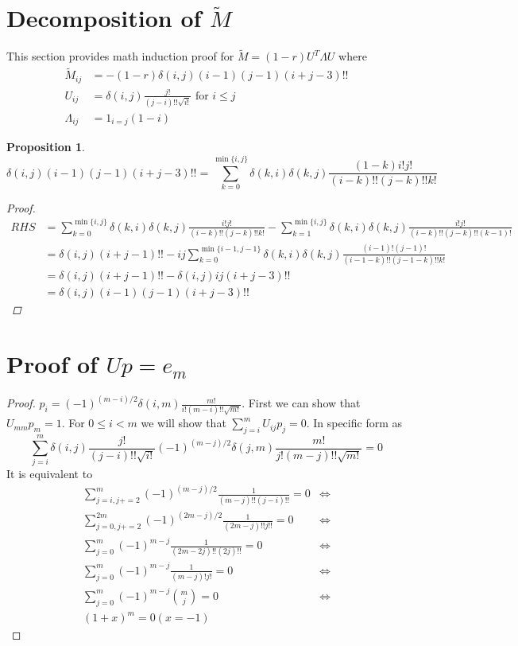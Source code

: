 \documentclass{article}
\newtheorem{proposition}{Proposition}
\begin{document}
\section{Decomposition of $\widetilde{M}$}
This section provides math induction proof for
$\widetilde{M}= (1-r) U^T \Lambda U$ where
\begin{align}
\widetilde{M}_{ij} & = -(1-r)\delta(i, j) (i-1)(j-1) (i+j-3)!! \\
U_{ij} & = \delta(i, j) \frac{j!}{(j-i)!!\sqrt{i!}} \textrm{ for } i\leq j \\
\Lambda_{ij} & = 1_{i = j} (1-i)
\end{align}
\begin{proposition}\label{prop:UUM}
\begin{equation}
\delta(i, j)(i-1)(j-1)(i+j-3)!! = \sum_{k=0}^{\min\{i, j\}}
\delta(k, i) \delta(k, j) \frac{(1-k)i!j!}{(i-k)!!(j-k)!!k!}
\end{equation}
\begin{proof}
\begin{align*}
RHS & = \sum_{k=0}^{\min\{i, j\}}
\delta(k, i) \delta(k, j) \frac{i!j!}{(i-k)!!(j-k)!!k!}
- \sum_{k=1}^{\min\{i, j\}}
\delta(k, i) \delta(k, j) \frac{i!j!}{(i-k)!!(j-k)!!(k-1)!} \\
& = \delta(i, j)(i+j-1)!! - ij\sum_{k=0}^{\min\{i-1, j-1\}}
\delta(k, i) \delta(k, j) \frac{(i-1)!(j-1)!}{(i-1-k)!!(j-1-k)!!k!} \\
& = \delta(i, j)(i+j-1)!! - \delta(i, j)ij(i+j-3)!! \\
& = \delta(i, j)(i-1)(j-1)(i+j-3)!!
\end{align*}
\end{proof}
\end{proposition}
\section{Proof of $Up=e_m$}
\begin{proof}
$p_i = (-1)^{(m-i)/2}\delta(i, m) \frac{m!}{i!(m-i)!! \sqrt{m!}} $.
First we can show that $U_{mm} p_m = 1 $. For $ 0\leq i < m $ we
will show that $ \sum_{j=i}^m U_{ij} p_j = 0 $. In specific form as
\begin{equation}
\sum_{j=i}^m \delta(i, j) \frac{j!}{(j-i)!!\sqrt{i!}} (-1)^{(m-j)/2}\delta(j, m) \frac{m!}{j!(m-j)!! \sqrt{m!}} = 0
\end{equation}
It is equivalent to
\begin{align*}
\sum_{j=i, j+=2}^m (-1)^{(m-j)/2} \frac{1}{(m-j)!!(j-i)!!}  = 0 & \iff \\ 
\sum_{j=0, j+=2}^{2m} (-1)^{(2m-j)/2} \frac{1}{(2m-j)!! j!!} = 0 & \iff \\
\sum_{j=0}^{m} (-1)^{m-j} \frac{1}{(2m-2j)!! (2j)!!} = 0 & \iff \\
\sum_{j=0}^{m} (-1)^{m-j} \frac{1}{(m-j)! j!} = 0 & \iff \\
\sum_{j=0}^{m} (-1)^{m-j} \binom{m}{j} = 0 & \iff \\
(1+x)^m = 0 (x=-1)
\end{align*}
\end{proof}
\end{document}
